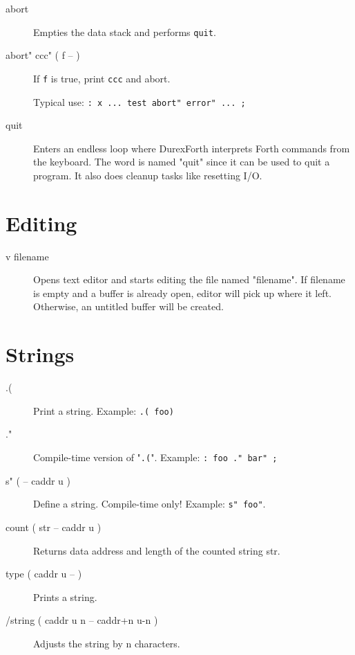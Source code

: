\begin{description}
\item[abort] Empties the data stack and performs \texttt{quit}.

\item[abort" ccc" ( f -- ) ] If \texttt{f} is true, print \texttt{ccc} and abort.

    Typical use: \texttt{: x ... test abort" error" ... ;}

\item[quit] Enters an endless loop where DurexForth interprets Forth commands from the keyboard. The word is named "quit" since it can be used to quit a program. It also does cleanup tasks like resetting I/O.

\end{description}

\section{Editing}

\begin{description}
\item[v filename]

Opens text editor and starts editing the file named "filename".
If filename is empty and a buffer is already open, editor will pick up where it left.
Otherwise, an untitled buffer will be created.

\end{description}

\section{Strings}

\begin{description}
\item[.(]

Print a string. Example: \texttt{.( foo)}

\item[."]

Compile-time version of "\texttt{.(}". Example: \texttt{: foo ." bar" ;}

\item[s" ( -- caddr u )] Define a string. Compile-time only! Example: \texttt{s" foo"}.

\item[count ( str -- caddr u )] Returns data address and length of the counted string str.

\item[type ( caddr u -- )] Prints a string.

\item[/string ( caddr u n -- caddr+n u-n )] Adjusts the string by n characters.

\end{description}

